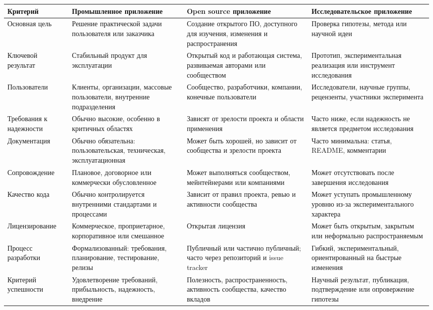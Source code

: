 \documentclass[12pt,a4paper]{article}
\begin{document}
\begin{longtable}{|p{3.6cm}|p{4cm}|p{4cm}|p{4cm}|}
\hline
\textbf{Критерий} &
\textbf{Промышленное приложение} &
\textbf{Open source приложение} &
\textbf{Исследовательское приложение} \\
\hline
Основная цель &
Решение практической задачи пользователя или заказчика &
Создание открытого ПО, доступного для изучения, изменения и распространения &
Проверка гипотезы, метода или научной идеи \\
\hline
Ключевой результат &
Стабильный продукт для эксплуатации &
Открытый код и работающая система, развиваемая авторами или сообществом &
Прототип, экспериментальная реализация или инструмент исследования \\
\hline
Пользователи &
Клиенты, организации, массовые пользователи, внутренние подразделения &
Сообщество, разработчики, компании, конечные пользователи &
Исследователи, научные группы, рецензенты, участники эксперимента \\
\hline
Требования к надежности &
Обычно высокие, особенно в критичных областях &
Зависят от зрелости проекта и области применения &
Часто ниже, если надежность не является предметом исследования \\
\hline
Документация &
Обычно обязательна: пользовательская, техническая, эксплуатационная &
Может быть хорошей, но зависит от сообщества и зрелости проекта &
Часто минимальна: статья, README, комментарии \\
\hline
Сопровождение &
Плановое, договорное или коммерчески обусловленное &
Может выполняться сообществом, мейнтейнерами или компаниями &
Может отсутствовать после завершения исследования \\
\hline
Качество кода &
Обычно контролируется внутренними стандартами и процессами &
Зависит от правил проекта, ревью и активности сообщества &
Может уступать промышленному уровню из-за экспериментального характера \\
\hline
Лицензирование &
Коммерческое, проприетарное, корпоративное или смешанное &
Открытая лицензия &
Может быть открытым, закрытым или неформально распространяемым \\
\hline
Процесс разработки &
Формализованный: требования, планирование, тестирование, релизы &
Публичный или частично публичный; часто через репозиторий и issue tracker &
Гибкий, экспериментальный, ориентированный на быстрые изменения \\
\hline
Критерий успешности &
Удовлетворение требований, прибыльность, надежность, внедрение &
Полезность, распространенность, активность сообщества, качество вкладов &
Научный результат, публикация, подтверждение или опровержение гипотезы \\
\hline
\end{longtable}
\end{document}
